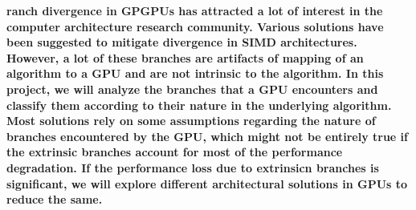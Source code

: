 
\textbf{ranch divergence in GPGPUs has attracted a lot of interest in the computer architecture research community. Various solutions have been suggested to mitigate divergence in SIMD architectures. However, a lot of these branches are artifacts of mapping of an algorithm to a GPU and are not intrinsic to the algorithm. In this project, we will analyze the branches that a GPU encounters and classify them according to their nature in the underlying algorithm. Most solutions rely on some assumptions regarding the nature of branches encountered by the GPU, which might not be entirely true if the extrinsic branches account for most of the performance degradation. If the performance loss due to extrinsicn branches is significant, we will explore different architectural solutions in GPUs to reduce the same.}


